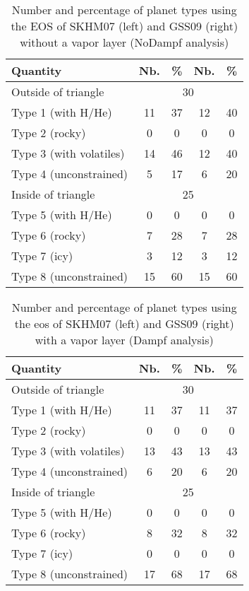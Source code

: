 \documentclass[]{emulateapj}
\begin{document}
\begin{table}[h]
\caption{Number and percentage of planet types using the EOS of 
SKHM07 (left) and GSS09 (right) without a vapor layer (NoDampf analysis)}
\begin{center}
\begin{tabular}{lcc|cc}
Quantity & Nb.  & \% & Nb. &  \%\\ \hline
Outside of  triangle       &       \multicolumn{4}{c}{30}  \\
Type 1 (with H/He)  &            11  & 37 &  12 & 40\\   
Type 2 (rocky)     &       0  &  0  & 0 & 0\\  
Type 3 (with volatiles)    &      14 & 46 & 12 & 40 \\    
Type 4 (unconstrained)        &       5 & 17  & 6 & 20 \\  \hline  
Inside of triangle       &       \multicolumn{4}{c}{25}  \\
Type 5 (with H/He)            &   0  & 0  & 0 & 0\\    
Type 6 (rocky)          &   7 & 28  & 7  & 28\\    
Type 7 (icy)           &    3 & 12 & 3 & 12 \\    
Type 8 (unconstrained)           &    15 & 60 & 15 & 60  \\
 \end{tabular}
 \end{center}
\label{statsnodampf}
\end{table}%

\begin{table}[h]
\caption{Number and percentage of planet types using the eos of SKHM07  (left) and GSS09 (right) with a vapor layer (Dampf analysis)}
\begin{center}
\begin{tabular}{lcc|cc}
Quantity & Nb.  & \% & Nb. &  \%\\ \hline
Outside of  triangle       &       \multicolumn{4}{c}{30}  \\
Type 1 (with H/He)  &            11  & 37 &  11 & 37\\   
Type 2 (rocky)     &       0  &  0  & 0 & 0\\  
Type 3 (with volatiles)    &      13 & 43 & 13 & 43 \\    
Type 4 (unconstrained)        &       6 & 20  & 6 & 20 \\  \hline  
Inside of triangle       &       \multicolumn{4}{c}{25}  \\
Type 5 (with H/He)            &   0  & 0  & 0 & 0\\    
Type 6 (rocky)          &   8 & 32  & 8  & 32\\    
Type 7 (icy)           &    0 & 0 & 0 & 0 \\    
Type 8 (unconstrained)           &    17 & 68 & 17 & 68  \\
 \end{tabular}
\end{center}
\label{statsdampf}
\end{table}%
\end{document}
